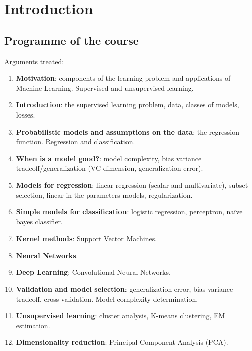 \documentclass[../../main/main.tex]{subfiles}
\begin{document}
\chapter*{Introduction}




\section*{Programme of the course}

Arguments treated:

\begin{enumerate}
	\item \textbf{Motivation}: components of the learning problem and applications of Machine Learning. Supervised and unsupervised learning.
	\item \textbf{Introduction}: the supervised learning problem, data, classes of models, losses.
	\item \textbf{Probabilistic models and assumptions on the data}: the regression function. Regression and classification.
	\item \textbf{When is a model good?}: model complexity, bias variance tradeoff/generalization (VC dimension, generalization error).
	\item \textbf{Models for regression}: linear regression (scalar and multivariate), subset selection, linear-in-the-parameters models, regularization.
	\item \textbf{Simple models for classification}: logistic regression, perceptron, naïve bayes classifier.
	\item \textbf{Kernel methods}: Support Vector Machines.
	\item \textbf{Neural Networks}.
	\item \textbf{Deep Learning}: Convolutional Neural Networks.
	\item \textbf{Validation and model selection}: generalization error, bias-variance tradeoff, cross validation. Model complexity determination.
	\item \textbf{Unsupervised learning}: cluster analysis, K-means clustering, EM estimation.
	\item \textbf{Dimensionality reduction}: Principal Component Analysis (PCA).
\end{enumerate}
\end{document}
